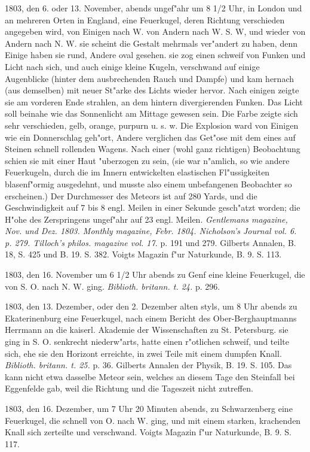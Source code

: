 \documentclass[a4paper, 11pt, oneside, polutonikogreek, german]{article}
\begin{document}
1803, den 6. oder 13. November, abends ungef"ahr um 8 1/2 Uhr, in London und an mehreren Orten in England, eine Feuerkugel, deren Richtung verschieden angegeben wird, von Einigen nach W. von Andern nach W. S. W, und wieder von Andern nach N. W. sie scheint die Gestalt mehrmals ver"andert zu haben, denn Einige haben sie rund, Andere oval gesehen. sie zog einen schweif von Funken und Licht nach sich, und auch einige kleine Kugeln, verschwand auf einige Augenblicke (hinter dem ausbrechenden Rauch und Dampfe) und kam hernach (aus demselben) mit neuer St"arke des Lichts wieder hervor. Nach einigen zeigte sie am vorderen Ende strahlen, an dem hintern divergierenden Funken. Das Licht soll beinahe wie das Sonnenlicht am Mittage gewesen sein. Die Farbe zeigte sich sehr verschieden, gelb, orange, purpurn u. s. w. Die Explosion ward von Einigen wie ein Donnerschlag geh"ort, Andere verglichen das Get"ose mit dem eines auf Steinen schnell rollenden Wagens. Nach einer (wohl ganz richtigen) Beobachtung schien sie mit einer Haut "uberzogen zu sein, (sie war n"amlich, so wie andere Feuerkugeln, durch die im Innern entwickelten elastischen Fl"ussigkeiten blasenf"ormig ausgedehnt, und musste also einem unbefangenen Beobachter so erscheinen.) Der Durchmesser des Meteors ist auf 280 Yards, und die Geschwindigkeit auf 7 bis 8 engl. Meilen in einer Sekunde gesch"atzt worden; die H"ohe des Zerspringens ungef"ahr auf 23 engl. Meilen. \emph{Gentlemans magazine, Nov. und Dez. 1803. Monthly magazine, Febr. 1804. Nicholson's Journal vol. 6. p. 279. Tilloch's philos. magazine vol. 17.} p. 191 und 279. Gilberts Annalen, B. 18, S. 425 und B. 19. S. 382. Voigts Magazin f"ur Naturkunde, B. 9. S. 113.

1803, den 16. November um 6 1/2 Uhr abends zu Genf eine kleine Feuerkugel, die von S. O. nach N. W. ging. \emph{Biblioth. britann. t. 24.} p. 296.

1803, den 13. Dezember, oder den 2. Dezember alten styls, um 8 Uhr abends zu Ekaterinenburg eine Feuerkugel, nach einem Bericht des Ober-Berghauptmanns Herrmann an die kaiserl. Akademie der Wissenschaften zu St. Petersburg. sie ging in S. O. senkrecht niederw"arts, hatte einen r"otlichen schweif, und teilte sich, ehe sie den Horizont erreichte, in zwei Teile mit einem dumpfen Knall. \emph{Biblioth. britann. t. 25.} p. 36. Gilberts Annalen der Physik, B. 19. S. 105. Das kann nicht etwa dasselbe Meteor sein, welches an diesem Tage den Steinfall bei Eggenfelde gab, weil die Richtung und die Tageszeit nicht zutreffen.

1803, den 16. Dezember, um 7 Uhr 20 Minuten abends, zu Schwarzenberg eine Feuerkugel, die schnell von O. nach W. ging, und mit einem starken, krachenden Knall sich zerteilte und verschwand. Voigts Magazin f"ur Naturkunde, B. 9. S. 117.
\end{document}
